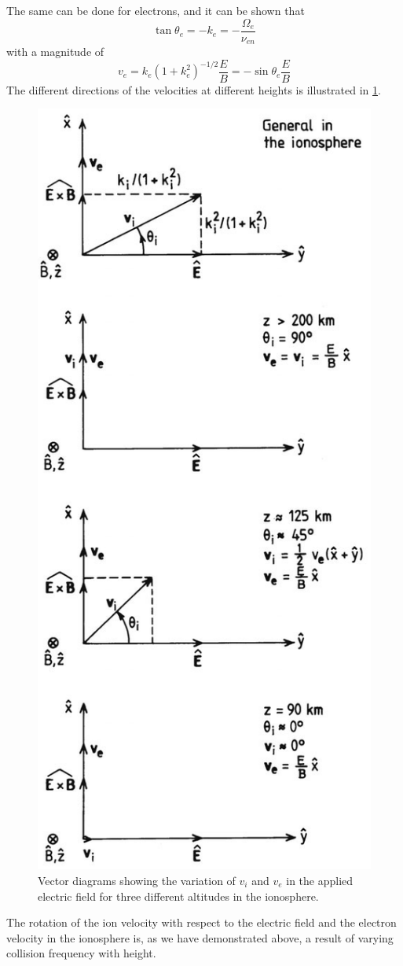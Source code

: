 The same can be done for electrons, and it can be shown that
\begin{equation*}
    \tan\theta_e=-k_e=-\frac{\Omega_e}{\nu_{en}}
\end{equation*}
with a magnitude of
\begin{equation*}
    v_e=k_e{\left(1+k_e^2\right)}^{-1/2}\frac{E}{B}=-\sin\theta_e\frac{E}{B}
\end{equation*}
The different directions of the velocities at different heights is illustrated in \cref{fig:L14_v_i_v_e_electric_field}.
\begin{figure}[t]
    \centering
    \includegraphics[width=.4\linewidth]{bilder/L14_v_i_v_e_electric_field.jpg}
    \caption{Vector diagrams showing the variation of \(v_i\) and \(v_e\) in the applied electric field for three different altitudes in the ionosphere.}\label{fig:L14_v_i_v_e_electric_field}
\end{figure}
The rotation of the ion velocity with respect to the electric field and the electron velocity in the ionosphere is, as we have demonstrated above, a result of varying collision frequency with height.

